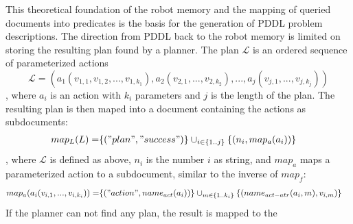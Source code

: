 This theoretical foundation of the robot memory and the mapping of
queried documents into predicates is the basis for the generation of
PDDL problem descriptions. The direction from PDDL back to the robot
memory is limited on storing the resulting plan found by a
planner. The plan $\mathcal{L}$ is an ordered sequence of
parameterized actions
$$\mathcal{L}=(a_1(v_{1,1},v_{1,2},...,v_{1,k_1}),a_2(v_{2,1},...,v_{2,k_2}),...,a_j(v_{j,1},...,v_{j,k_j}))$$,
where $a_i$ is an action with $k_i$ parameters and $j$ is the length
of the plan. The resulting plan is then maped into a document
containing the actions as subdocuments:
\begin{align*}
  map_L(L)=&\{("plan", "success")\} \cup_{i \in \{1..j\}}\{(n_i, map_a(a_i))\}
\end{align*}, where $\mathcal{L}$ is defined as above, $n_i$ is the
number $i$ as string, and $map_a$ maps a parameterized action to a
subdocument, similar to the inverse of $map_f$:
\begin{align*}
  map_a(a_i(v_{i,1},...,v_{i,k_i}))= &\{("action", name_{act}(a_i))\} 
\cup_{m \in \{1..k_i\}}\{(name_{act-atr}(a_i,m), v_{i,m})\}
\end{align*}
If the planner can not find any plan, the result is mapped to the
